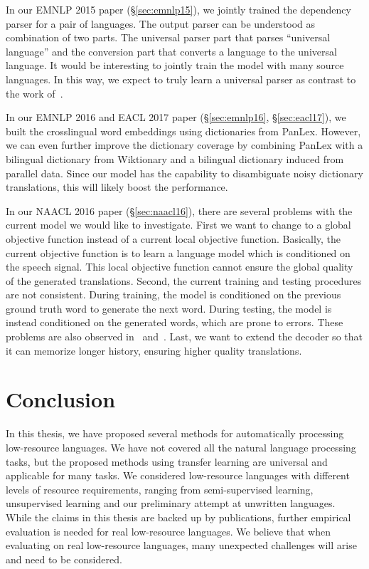 \documentclass[12pt,twoside,final,hidelinks]{ltthesis}
\theoremstyle{definition}
\newcommand\emnlpvp{EMNLP 2015 paper (\S\ref{sec:emnlp15})}
\newcommand\naaclvip{NAACL 2016 paper (\S\ref{sec:naacl16})}
\begin{document}
In our \emnlpvp, we jointly trained the dependency parser for a pair of languages. The output parser can be understood as combination of two parts. The universal
parser part that parses ``universal language'' and the conversion part that converts a language to the universal language. It would be interesting to jointly train the model with many source languages. In this way, we expect to truly learn a universal parser as contrast to the work of~.  

In our EMNLP 2016 and EACL 2017 paper (\S\ref{sec:emnlp16}, \S\ref{sec:eacl17}), we built the crosslingual word embeddings using dictionaries from PanLex. However, we can even further improve 
the dictionary coverage by combining PanLex with a bilingual dictionary from Wiktionary and a bilingual dictionary induced from parallel data. Since our model 
has the capability to disambiguate noisy dictionary translations, this will likely boost the performance. 

In our \naaclvip, there are several problems with the current model we would like to investigate. First we want to change to a global objective function 
instead of a current local objective function. Basically, the current objective function is to learn a language model which is conditioned on the speech signal. 
This local objective function cannot ensure the global quality of the generated translations. Second, the current training and testing procedures are not consistent. During training, the model is conditioned on the previous ground truth word to generate the next word. During testing, the model is instead conditioned on the generated words, which are prone to errors. These problems are also observed in~ and~. Last, we want to extend the decoder so that it can memorize longer history, ensuring higher quality translations. 

\section{Conclusion}
In this thesis, we have proposed several methods for automatically processing low-resource languages. We have not covered all the natural language 
processing tasks, but the proposed methods using transfer learning are universal and applicable for many tasks. We considered low-resource
languages with different levels of resource requirements, ranging from semi-supervised learning, unsupervised learning and our preliminary attempt at unwritten languages. 
While the claims in this thesis are backed up by publications, further empirical evaluation is needed for real low-resource 
languages. We believe that when evaluating on real low-resource languages, many unexpected challenges will arise and need to be considered. 
\end{document}
